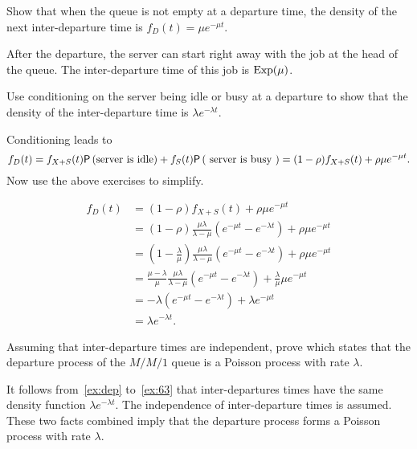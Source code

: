 \documentclass[companion]{subfiles}
\begin{document}
\begin{extra}
Show that when the queue is not empty at a departure time, the density of the next inter-departure time is $f_D(t) = \mu e^{-\mu t}$.
\begin{solution}
After the departure, the server can start right away with the job at the head of the queue. The inter-departure time of this job is $\operatorname{Exp}(\mu)$.
\end{solution}
\end{extra}

\begin{extra}
Use conditioning on the server being idle or busy at a departure to show that the density of the inter-departure time is $\lambda e^{-\lambda t}$.
\begin{hint}
Conditioning leads to 
\begin{equation*}
 f_D(t) = f_{X+S}(t) \P{\text{server is idle}} + f_S(t) \P{\text{ server is busy }}= (1-\rho) f_{X+S}(t) +
 \rho \mu e^{-\mu t}.
\end{equation*}
 Now use the above exercises to simplify.
\end{hint}
\begin{solution}
 \begin{align*}
 f_D(t) 
&= (1-\rho) f_{X+S}(t) + \rho \mu e^{-\mu t} \\
&= (1-\rho) \frac{\mu\lambda}{\lambda-\mu} \left(e^{-\mu t}-e^{-\lambda t}\right) + \rho \mu e^{-\mu t} \\
&= \left(1-\frac{\lambda}\mu\right) \frac{\mu\lambda}{\lambda-\mu}\left(e^{-\mu t}-e^{-\lambda t}\right) + \rho \mu e^{-\mu t} \\
&= \frac{\mu-\lambda}\mu \frac{\mu\lambda}{\lambda-\mu}\left(e^{-\mu t}-e^{-\lambda t}\right) + \frac\lambda \mu \mu e^{-\mu t} \\
&= - \lambda\left(e^{-\mu t}-e^{-\lambda t}\right) + \lambda e^{-\mu t} \\
&= \lambda e^{-\lambda t}.
 \end{align*}
\end{solution}
\end{extra}


\begin{exercise}
Assuming that  inter-departure times are independent,  prove  which states that the departure process of the $M/M/1$ queue is a Poisson process with rate $\lambda$.
\begin{solution}
  It follows from~\cref{ex:dep} to~\cref{ex:63} that inter-departures times have the same density function $\lambda e^{-\lambda t}$.
  The independence of inter-departure times is assumed.
  These two facts combined imply that the departure process forms a Poisson process with rate $\lambda$.
\end{solution}
\end{exercise}
\end{document}
